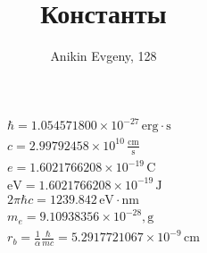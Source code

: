 \documentclass{article}
\title{Константы}
\author{Anikin Evgeny, 128}
\begin{document}
    \begin{equation}
        \begin{gathered}
            \hbar = 1.054571800\times10^{-27}\, \mathrm{erg}\cdot\mathrm{s}\\
            c = 2.99792458\times 10^{10}\, \frac{\mathrm{cm}}{\mathrm{s}}\\
            e = 1.6021766208\times 10^{-19}\, \mathrm{C}\\
            \mathrm{eV} = 1.6021766208\times 10^{-19}\, \mathrm{J}\\
            2\pi\hbar c = 1239.842\, \mathrm{eV}\cdot\mathrm{nm}\\
            m_e = 9.10938356\times 10^{-28}, \mathrm{g}\\
            r_b = \frac{1}{\alpha} \frac{\hbar}{mc} = 5.2917721067\times 10^{-9} 
                                                                    \, \mathrm{cm}\\
        \end{gathered}
    \end{equation}
\end{document}

